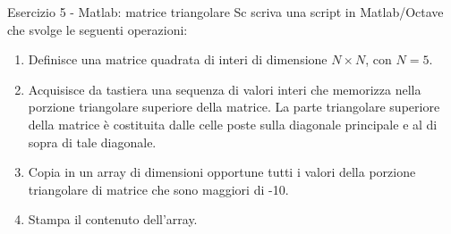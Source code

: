 \documentclass[]{beamer}
\begin{document}
\begin{frame}{Esercizio 5 - Matlab: matrice triangolare}
Sc scriva una script in Matlab/Octave che svolge le seguenti operazioni:
\begin{enumerate}
	\item Definisce una matrice quadrata di interi di dimensione $N\times N$, con $N=5$.
	\item Acquisisce da tastiera una sequenza di valori interi che memorizza nella	porzione triangolare superiore della matrice. La parte triangolare superiore della matrice è costituita dalle celle poste sulla diagonale principale e al di sopra di tale diagonale.
	\item Copia in un array di dimensioni opportune tutti i valori della porzione triangolare di matrice che sono maggiori di -10.
	\item Stampa il contenuto dell’array.
\end{enumerate}
\end{frame}
\end{document}
